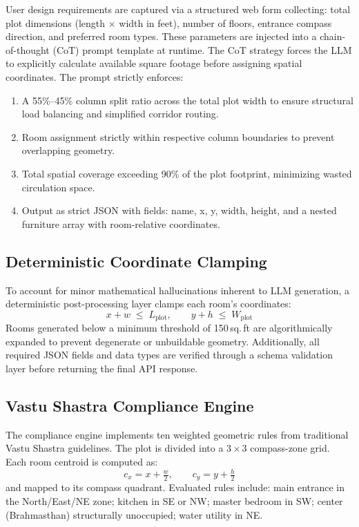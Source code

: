 \documentclass[10pt, twocolumn, letterpaper]{article}
\begin{document}
User design requirements are captured via a structured web form collecting:
total plot dimensions (length $\times$ width in feet), number of floors,
entrance compass direction, and preferred room types. These parameters are
injected into a chain-of-thought (CoT) prompt template at runtime. The CoT
strategy forces the LLM to explicitly calculate available square footage before
assigning spatial coordinates. The prompt strictly enforces:
\begin{enumerate}[leftmargin=*, label=\arabic*., itemsep=0pt, topsep=2pt]
  \item A 55\%--45\% column split ratio across the total plot width to ensure
        structural load balancing and simplified corridor routing.
  \item Room assignment strictly within respective column boundaries to prevent
        overlapping geometry.
  \item Total spatial coverage exceeding 90\% of the plot footprint, minimizing
        wasted circulation space.
  \item Output as strict JSON with fields: name, x,
        y, width, height, and a nested
        furniture array with room-relative coordinates.
\end{enumerate}

\subsection{Deterministic Coordinate Clamping}

To account for minor mathematical hallucinations inherent to LLM generation,
a deterministic post-processing layer clamps each room's coordinates:
\begin{equation}
  x + w \;\leq\; L_{\text{plot}}, \qquad y + h \;\leq\; W_{\text{plot}}
\end{equation}
Rooms generated below a minimum threshold of 150\,sq.\,ft are algorithmically
expanded to prevent degenerate or unbuildable geometry. Additionally, all
required JSON fields and data types are verified through a schema
validation layer before returning the final API response.

\subsection{Vastu Shastra Compliance Engine}

The compliance engine implements ten weighted geometric rules from traditional
Vastu Shastra guidelines. The plot is divided into a $3{\times}3$ compass-zone
grid. Each room centroid is computed as:
\begin{equation}
  c_x = x + \tfrac{w}{2}, \qquad c_y = y + \tfrac{h}{2}
\end{equation}
and mapped to its compass quadrant. Evaluated rules include: main entrance in
the North/East/NE zone; kitchen in SE or NW; master bedroom in SW; center
(Brahmasthan) structurally unoccupied; water utility in NE.
\end{document}
